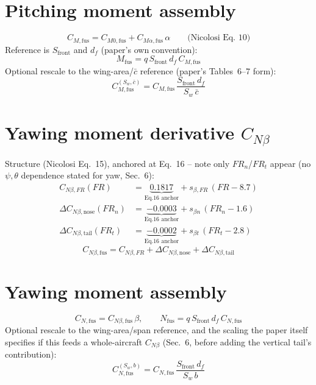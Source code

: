 \documentclass[11pt]{article}
\begin{document}
\section{Pitching moment assembly}
\label{sec:pitchassembly}

\begin{equation}
C_{M,\text{fus}} = C_{M0,\text{fus}} + C_{M\alpha,\text{fus}}\,\alpha
\qquad\text{(Nicolosi Eq.~10)}
\end{equation}
Reference is $S_{\text{front}}$ and $d_f$ (paper's own convention):
\begin{equation}
M_{\text{fus}} = q\,S_{\text{front}}\,d_f\,C_{M,\text{fus}}
\end{equation}
Optional rescale to the wing-area/$\bar c$ reference (paper's Tables~6--7 form):
\begin{equation}
C_{M,\text{fus}}^{(S_w,\bar c)} = C_{M,\text{fus}}\,\frac{S_{\text{front}}\,d_f}{S_w\,\bar c}
\end{equation}

\section{Yawing moment derivative $C_{N\beta}$}
\label{sec:yaw}

Structure (Nicolosi Eq.~15), anchored at Eq.~16 -- note only $FR_n$/$FR_t$
appear (no $\psi,\theta$ dependence stated for yaw, Sec.~6):
\begin{align}
C_{N\beta,FR}(FR) &= \underbrace{0.1817}_{\text{Eq.16 anchor}} + s_{\beta,FR}\,(FR-8.7) \\
\Delta C_{N\beta,\text{nose}}(FR_n) &= \underbrace{-0.0003}_{\text{Eq.16 anchor}} + s_{\beta n}\,(FR_n-1.6) \\
\Delta C_{N\beta,\text{tail}}(FR_t) &= \underbrace{-0.0002}_{\text{Eq.16 anchor}} + s_{\beta t}\,(FR_t-2.8)
\end{align}
\begin{equation}
C_{N\beta,\text{fus}} = C_{N\beta,FR}+\Delta C_{N\beta,\text{nose}}+\Delta C_{N\beta,\text{tail}}
\end{equation}

\section{Yawing moment assembly}
\label{sec:yawassembly}

\begin{equation}
C_{N,\text{fus}} = C_{N\beta,\text{fus}}\,\beta,
\qquad
N_{\text{fus}} = q\,S_{\text{front}}\,d_f\,C_{N,\text{fus}}
\end{equation}
Optional rescale to the wing-area/span reference, and the scaling the
paper itself specifies if this feeds a whole-aircraft $C_{N\beta}$
(Sec.~6, before adding the vertical tail's contribution):
\begin{equation}
C_{N,\text{fus}}^{(S_w,b)} = C_{N,\text{fus}}\,\frac{S_{\text{front}}\,d_f}{S_w\,b}
\end{equation}
\end{document}
